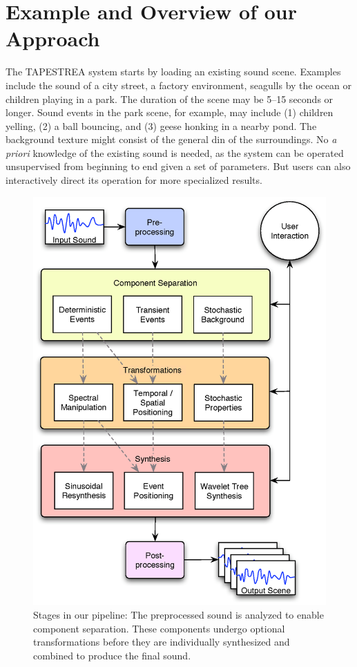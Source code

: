 \documentclass{acmsiggraph}               %
\begin{document}
\section{Example and Overview of our Approach}

The TAPESTREA system starts by loading an existing sound scene. Examples include the sound of 
a city street, a factory environment, seagulls by the ocean or children playing in a park.
The duration of the scene may be 5--15 seconds or longer. Sound events in the park scene, 
for example, may include (1) children yelling, (2) 
a ball bouncing, and (3) geese honking in a nearby pond. The background texture might 
consist of the general din of the surroundings. No 
{\it a priori} knowledge of the existing sound is needed, as the system can be operated 
unsupervised from beginning to end given a set of parameters. But users can also interactively 
direct its operation for more specialized results.

\begin{figure}[h]
\centering
\includegraphics[width=.95\columnwidth]{ourpipeline2.eps}
\caption{Stages in our pipeline: The preprocessed sound is analyzed to enable component separation. These components undergo optional transformations before they are individually synthesized and combined to produce the final sound.}
\label{fig:pipeline}
\end{figure}
\end{document}
